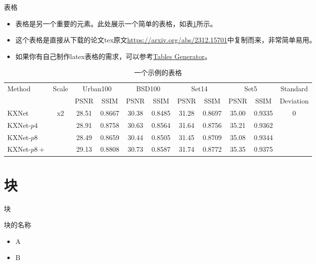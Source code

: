 \documentclass[aspectratio=169]{beamer}
\begin{document}
\begin{frame}{表格}
    \begin{itemize}
        \item 表格是另一个重要的元素。此处展示一个简单的表格，如表\ref{tab:table}所示。
        \item 这个表格是直接从下载的论文tex原文\url{https://arxiv.org/abs/2312.15701}中复制而来，非常简单易用。
        \item 如果你有自己制作latex表格的需求，可以参考\href{https://www.tablesgenerator.com/}{Tables Generator}。
    \end{itemize}
    \vspace{-1em}
    \scriptsize
    \begin{table}
        \centering
        \begin{tabular}{lcccccccccc}
            \toprule
            \multirow{2}{*}{Method} & \multirow{2}{*}{Scale} & \multicolumn{2}{c}{Urban100} & \multicolumn{2}{c}{BSD100} & \multicolumn{2}{c}{Set14} & \multicolumn{2}{c}{Set5} & Standard \\
            \cmidrule(r){3-4} \cmidrule(r){5-6} \cmidrule(r){7-8} \cmidrule(r){9-10}
            & & PSNR & SSIM & PSNR & SSIM & PSNR & SSIM & PSNR & SSIM & Deviation\\ 
            \midrule
            KXNet & \multirow{4}{*}{x2} & 28.51 & 0.8667 & 30.38 & 0.8485 & 31.28 & 0.8697 & 35.00 & 0.9335 & \multirow{4}{*}{0} \\
            KXNet-$p4$ & & 28.91 & 0.8758 & 30.63 & 0.8564 & 31.64 & 0.8756 & 35.21 & 0.9362 &\\
            KXNet-$p8$ & & 28.49 & 0.8659 & 30.44 & 0.8505 & 31.45 & 0.8709 & 35.08 & 0.9344 &\\
            KXNet-$p8+$ & & 29.13 & 0.8808 & 30.73 & 0.8587 & 31.74 & 0.8772 & 35.35 & 0.9375 &\\
            \bottomrule
        \end{tabular}
        \caption{一个示例的表格}
        \label{tab:table}
    \end{table}
\end{frame}

\section{块}

\begin{frame}{块}
    \begin{block}{块的名称}
        \begin{itemize}
            \item A
            \item B
        \end{itemize}
    \end{block}	
\end{frame}
    
\end{document}
